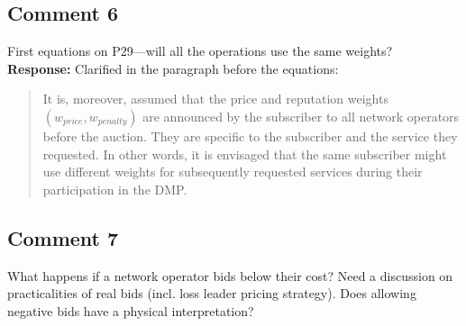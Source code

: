 \documentclass[10pt,a4paper,notitlepage]{article}
\numberwithin{equation}{section}
\begin{document}
\subsection{Comment 6}
First equations on P29---will all the operations use the same weights?\\[-2ex]

\textbf{Response:}
Clarified in the paragraph before the equations:
\begin{quote}
It is, moreover, assumed that the price and reputation weights $(w_{price}, w_{penalty})$ are announced by the subscriber to all network operators before the auction. They are specific to the subscriber and the service they requested. In other words, it is envisaged that the same subscriber might use different weights for subsequently requested services during their participation in the DMP.
\end{quote}

\subsection{Comment 7}
What happens if a network operator bids below their cost? Need a discussion on practicalities of real bids (incl. loss leader pricing strategy). Does allowing negative bids have a physical interpretation?\\[-2ex]
\end{document}
